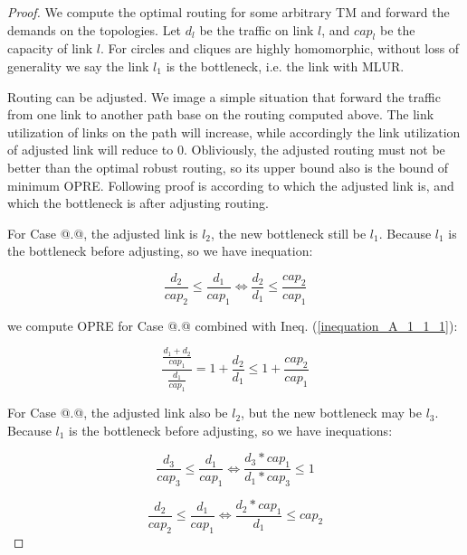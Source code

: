 \documentclass[conference]{IEEEtran}
\makeatletter
\newcommand{\Rmnum}[1]{\expandafter\@slowromancap\romannumeral #1@}
\makeatother
\begin{document}
\begin{proof}
We compute the optimal routing for some arbitrary TM and forward the demands on the topologies. Let $d_l$ be the 
traffic on link $l$, and $cap_l$ be the capacity of link $l$. For circles and cliques are highly homomorphic,
without loss of generality we say the link $l_1$ is the bottleneck, i.e. the link with MLUR.


Routing can be adjusted. We image a simple situation that forward the traffic from one link to another path base
on the routing computed above. The link utilization of links on the path will increase, while accordingly the 
link utilization of adjusted link will reduce to 0. Obliviously, the adjusted routing must not be better than
the optimal robust routing, so its upper bound also is the bound of minimum OPRE. Following proof is according 
to which the adjusted link is, and which the bottleneck is after adjusting routing.

For Case \Rmnum{1}.\Rmnum{1}, the adjusted link is $l_2$, the new bottleneck still be $l_1$. Because $l_1$ is the 
bottleneck before adjusting, so we have inequation:

\begin{equation}
\label{inequation_A_1_1_1}
\frac {d_2} {cap_2} \leq \frac {d_1} {cap_1} \Longleftrightarrow \frac {d_2}{d_1} \leq \frac{cap_2}{cap_1}
\end{equation}

we compute OPRE for Case \Rmnum{1}.\Rmnum{1} combined with Ineq. (\ref{inequation_A_1_1_1}):

\begin{equation}
\label{inequation_A_1_1_result}
\frac {\frac{d_1 + d_2}{cap_1}} {\frac{d_1}{cap_1}} = 1 + \frac{d_2}{d_1} \leq 1 + \frac{cap_2}{cap_1}
\end{equation}


For Case \Rmnum{1}.\Rmnum{2}, the adjusted link also be $l_2$, but the new bottleneck may be $l_3$.
Because $l_1$ is the bottleneck before adjusting, so we have inequations:

\begin{equation}
\label{inequation_A_1_2_1}
\frac {d_3} {cap_3} \leq \frac {d_1} {cap_1} \Longleftrightarrow \frac {d_3 * cap_1}{d_1 * cap_3} \leq 1
\end{equation}

\begin{equation}
\label{inequation_A_1_2_2}
\frac {d_2} {cap_2} \leq \frac {d_1} {cap_1} \Longleftrightarrow \frac {d_2 * cap_1}{d_1} \leq cap_2
\end{equation}


\end{proof}
\end{document}
